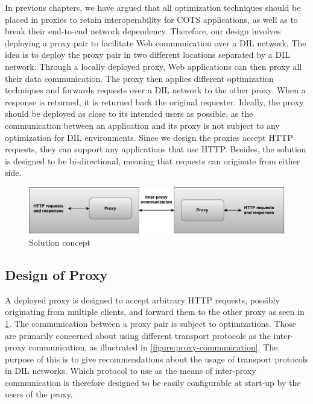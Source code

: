 In previous chapters, we have argued that all optimization techniques should be
placed in proxies to retain interoperability for COTS applications, as well as
to break their end-to-end network dependency. Therefore, our design involves
deploying a proxy pair to facilitate Web communication over a DIL network. The
idea is to deploy the proxy pair in two different locations separated by a DIL
network. Through a locally deployed proxy, Web applications can then proxy all
their data communication. The proxy then applies different optimization
techniques and forwards requests over a DIL network to the other proxy. When a
response is returned, it is returned back the original requester. Ideally, the
proxy should be deployed as close to its intended users as possible, as the
communication between an application and its proxy is not subject to any
optimization for DIL environments. Since we design the proxies accept HTTP
requests, they can support any applications that use HTTP. Besides, the solution
is designed to be bi-directional, meaning that requests can originate from
either side.

\begin{figure}[h]
\includegraphics[width=\textwidth]{images/proxy_design.pdf}
\caption{Solution concept}
\label{figure:proxy_design}
\end{figure}


\subsection{Design of Proxy}

A deployed proxy is designed to accept arbitrary HTTP requests, possibly
originating from multiple clients, and forward them to the other proxy as seen
in \cref{figure:proxy_design}. The communication between a proxy pair is subject
to optimizations. Those are primarily concerned about using different transport
protocols as the inter-proxy communication, as illustrated in
\cref{figure:proxy-communication}. The purpose of this is to give
recommendations about the usage of transport protocols in DIL networks. Which
protocol to use as the means of inter-proxy communication is therefore designed
to be easily configurable at start-up by the users of the proxy.



